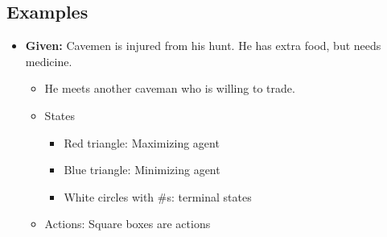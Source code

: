 \subsection{Examples}
\begin{example}
    \begin{itemize}
        \item \textbf{Given:} Cavemen is injured from his hunt. He has extra food, but needs medicine.
        \begin{itemize}
            \item He meets another caveman who is willing to trade. 
        \end{itemize} 
        \vspace{-1.5em}
        \begin{itemize}
            \item States
            \begin{itemize}
                \item Red triangle: Maximizing agent
                \item Blue triangle: Minimizing agent
                \item White circles with \#s: terminal states
            \end{itemize}
            \item Actions: Square boxes are actions
        \end{itemize}
        \vspace{-1.5em}
        \vspace{-1.5em}
    \end{itemize}
\end{example}